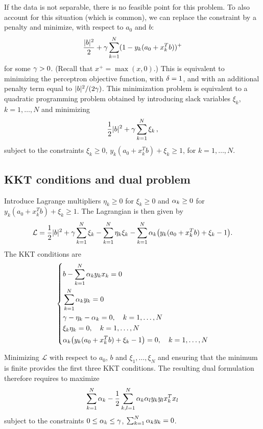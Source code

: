 If the data is not separable, there is no feasible point for this problem. To also account for this situation (which is common), 
we can replace the constraint by a penalty and minimize, with respect to ${a_0}$ and  $b$:
\[
\frac{|b|^2}2 + \gamma \sum_{k=1}^N (1 - y_k({a_0} + x_k^T b))^+
\]
for some $\gamma >0$. (Recall that $x^+ = \max(x, 0)$.) This is equivalent to minimizing the perceptron objective function, with $\delta=1$, and with an additional penalty term equal to $|b|^2/(2\gamma)$. This minimization problem is equivalent to a quadratic programming problem obtained by introducing  slack variables $\xi_k$, $k=1, \ldots, N$ and  minimizing
\[
\frac{1}{2} |b|^2 + \gamma \sum_{k=1}^N \xi_k\,,
\]
subject to the constraints $\xi_k \geq 0$, $y_k({a_0} + x_k^T b) + \xi_k
\geq 1$, for $k=1, \ldots, N$. 


\subsection{KKT conditions and dual problem}
Introduce Lagrange multipliers
$\eta_k\geq 0$ for $\xi_k \geq 0$ and $\alpha_k\geq 0$ for  $y_k({a_0} + x_k^T b) + \xi_k \geq 1$. 
The Lagrangian is then given by
$$
\mathcal L = \frac{1}{2} |b|^2 + \gamma \sum_{k=1}^N \xi_k - \sum_{k=1}^N
\eta_k\xi_k -  \sum_{k=1}^N \alpha_k \big(y_k({a_0} + x_k^T b) +\xi_k - 1\big).
$$
The KKT conditions are
\begin{equation}
\label{eq:svm.kkt.class}
\left\{
\begin{aligned}
&b - \sum_{k=1}^N \alpha_k y_k x_k = 0\\
&\sum_{k=1}^N \alpha_k y_k = 0\\
& \gamma - \eta_k - \alpha_k = 0,\quad  k=1, \ldots, N\\
& \xi_k\eta_k = 0, \quad k=1, \ldots, N\\
&  \alpha_k \big(y_k({a_0} + x_k^T b) +\xi_k - 1\big) = 0, \quad k=1, \ldots, N
\end{aligned}
\right.
\end{equation}

Minimizing $\mathcal L$ with respect to ${a_0}$, $b$ and $\xi_1, \ldots, \xi_N$ and ensuring that the minimum is finite provides the first three KKT conditions.
The resulting dual formulation therefore requires to
maximize
$$
\sum_{k=1}^N \alpha_k - \frac{1}{2} \sum_{k,l=1}^N \alpha_k\alpha_l y_ky_l x_k^Tx_l
$$
subject to the constraints $0\leq \alpha_k\leq \gamma$, $\sum_{k=1}^N \alpha_k y_k =
0$. 

